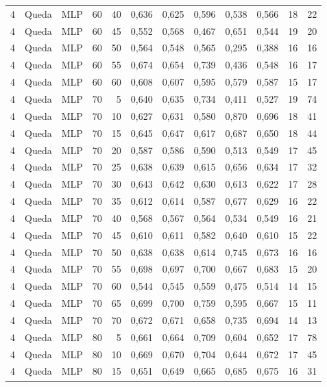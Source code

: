 \begin{longtable}{@{}rllrrrrrrrrr@{}}
4 & Queda & MLP & 60 & 40 & 0,636 & 0,625 & 0,596 & 0,538 & 0,566 & 18 & 22 \\
4 & Queda & MLP & 60 & 45 & 0,552 & 0,568 & 0,467 & 0,651 & 0,544 & 19 & 20 \\
4 & Queda & MLP & 60 & 50 & 0,564 & 0,548 & 0,565 & 0,295 & 0,388 & 16 & 16 \\
4 & Queda & MLP & 60 & 55 & 0,674 & 0,654 & 0,739 & 0,436 & 0,548 & 16 & 17 \\
4 & Queda & MLP & 60 & 60 & 0,608 & 0,607 & 0,595 & 0,579 & 0,587 & 15 & 17 \\
4 & Queda & MLP & 70 & 5 & 0,640 & 0,635 & 0,734 & 0,411 & 0,527 & 19 & 74 \\
4 & Queda & MLP & 70 & 10 & 0,627 & 0,631 & 0,580 & 0,870 & 0,696 & 18 & 41 \\
4 & Queda & MLP & 70 & 15 & 0,645 & 0,647 & 0,617 & 0,687 & 0,650 & 18 & 44 \\
4 & Queda & MLP & 70 & 20 & 0,587 & 0,586 & 0,590 & 0,513 & 0,549 & 17 & 45 \\
4 & Queda & MLP & 70 & 25 & 0,638 & 0,639 & 0,615 & 0,656 & 0,634 & 17 & 32 \\
4 & Queda & MLP & 70 & 30 & 0,643 & 0,642 & 0,630 & 0,613 & 0,622 & 17 & 28 \\
4 & Queda & MLP & 70 & 35 & 0,612 & 0,614 & 0,587 & 0,677 & 0,629 & 16 & 22 \\
4 & Queda & MLP & 70 & 40 & 0,568 & 0,567 & 0,564 & 0,534 & 0,549 & 16 & 21 \\
4 & Queda & MLP & 70 & 45 & 0,610 & 0,611 & 0,582 & 0,640 & 0,610 & 15 & 22 \\
4 & Queda & MLP & 70 & 50 & 0,638 & 0,638 & 0,614 & 0,745 & 0,673 & 16 & 16 \\
4 & Queda & MLP & 70 & 55 & 0,698 & 0,697 & 0,700 & 0,667 & 0,683 & 15 & 20 \\
4 & Queda & MLP & 70 & 60 & 0,544 & 0,545 & 0,559 & 0,475 & 0,514 & 14 & 15 \\
4 & Queda & MLP & 70 & 65 & 0,699 & 0,700 & 0,759 & 0,595 & 0,667 & 15 & 11 \\
4 & Queda & MLP & 70 & 70 & 0,672 & 0,671 & 0,658 & 0,735 & 0,694 & 14 & 13 \\
4 & Queda & MLP & 80 & 5 & 0,661 & 0,664 & 0,709 & 0,604 & 0,652 & 17 & 78 \\
4 & Queda & MLP & 80 & 10 & 0,669 & 0,670 & 0,704 & 0,644 & 0,672 & 17 & 45 \\
4 & Queda & MLP & 80 & 15 & 0,651 & 0,649 & 0,665 & 0,685 & 0,675 & 16 & 31 \\

\end{longtable}
